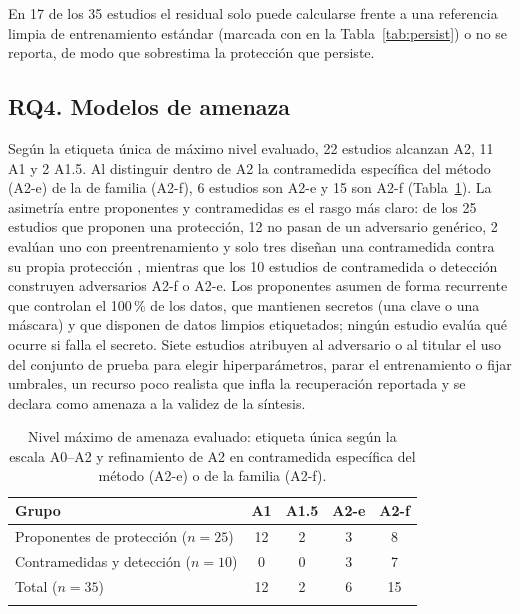 \documentclass[pdflatex,sn-mathphys-num]{sn-jnl}
\theoremstyle{thmstyleone}
\theoremstyle{thmstyletwo}
\theoremstyle{thmstylethree}
\begin{document}
En 17 de los 35 estudios el residual solo puede calcularse frente a una referencia limpia de entrenamiento estándar (marcada con \textdagger{} en la Tabla~\ref{tab:persist}) o no se reporta, de modo que sobrestima la protección que persiste.%
{}

\subsection{RQ4. Modelos de amenaza}

Según la etiqueta única de máximo nivel evaluado, 22 estudios alcanzan A2, 11 A1 y 2 A1.5. Al distinguir dentro de A2 la contramedida específica del método (A2-e) de la de familia (A2-f), 6 estudios son A2-e y 15 son A2-f (Tabla~\ref{tab:rq4}). La asimetría entre proponentes y contramedidas es el rasgo más claro: de los 25 estudios que proponen una protección, 12 no pasan de un adversario genérico, 2 evalúan uno con preentrenamiento y solo tres diseñan una contramedida contra su propia protección \cite{sadasivan2023cuda,li2025coin,ye2024ungeneralizable}, mientras que los 10 estudios de contramedida o detección construyen adversarios A2-f o A2-e. Los proponentes asumen de forma recurrente que controlan el 100\,\% de los datos, que mantienen secretos (una clave o una máscara) y que disponen de datos limpios etiquetados; ningún estudio evalúa qué ocurre si falla el secreto. Siete estudios \cite{zhu2024detection,jiang2023false,li2025crossmodal,zhang2023cleanlabel,hapuarachchi2025advancing,wang2024eclipse,dolatabadi2024devil} atribuyen al adversario o al titular el uso del conjunto de prueba para elegir hiperparámetros, parar el entrenamiento o fijar umbrales, un recurso poco realista que infla la recuperación reportada y se declara como amenaza a la validez de la síntesis.%
{}

\begin{table}[h]
\centering
\caption{Nivel máximo de amenaza evaluado: etiqueta única según la escala A0--A2 y refinamiento de A2 en contramedida específica del método (A2-e) o de la familia (A2-f).}\label{tab:rq4}
\footnotesize
\begin{tabular}{@{}lcccc@{}}
\toprule
Grupo & A1 & A1.5 & A2-e & A2-f \\
\midrule
Proponentes de protección ($n=25$) & 12 & 2 & 3 & 8 \\
Contramedidas y detección ($n=10$) & 0 & 0 & 3 & 7 \\
\midrule
Total ($n=35$) & 12 & 2 & 6 & 15 \\
\botrule
\end{tabular}
\end{table}
\end{document}
